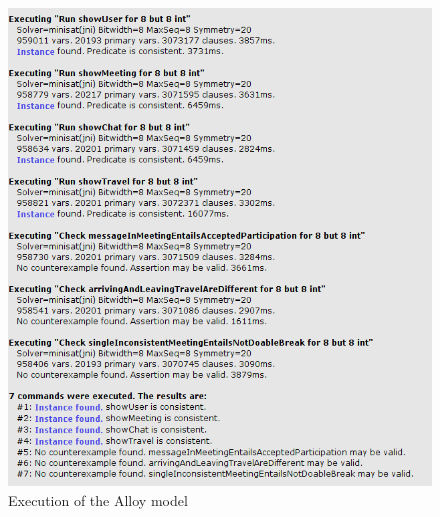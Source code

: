 \begin{figure}
	\includegraphics[width=\textwidth]{Images/AlloyResults.png}
	\caption{Execution of the Alloy model}
\end{figure}

